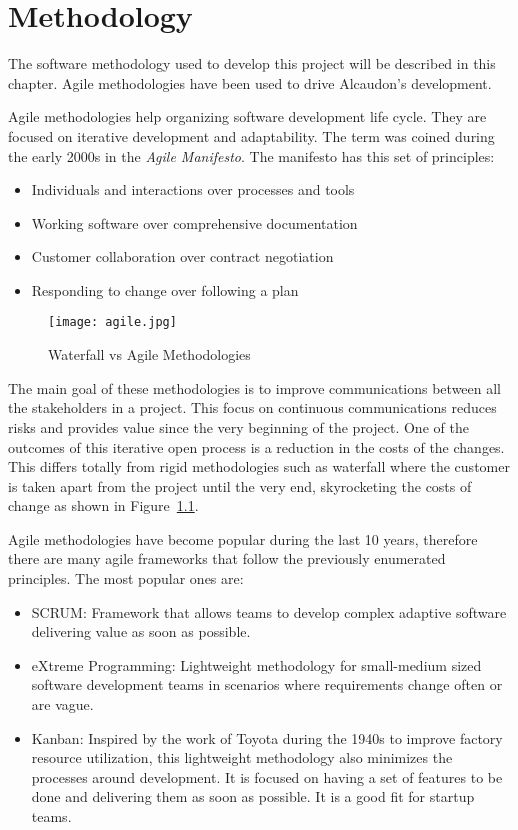 \chapter{Methodology}
The software methodology used to develop this project will be described in this
chapter. Agile methodologies have been used to drive Alcaudon's development.

Agile methodologies help organizing software development life cycle. They are
focused on iterative development and adaptability. The term was coined during
the early 2000s in the \textit{Agile Manifesto}\cite{manifesto}. The manifesto
has this set of principles:

\begin{itemize}
\item Individuals and interactions over processes and tools
\item Working software over comprehensive documentation
\item Customer collaboration over contract negotiation
\item Responding to change over following a plan
\end{itemize}


\begin{figure}
  \centering
  \texttt{[image: agile.jpg]}
  \caption{Waterfall vs Agile Methodologies\cite{waterfall}}
  \label{fig:waterfall}
\end{figure}

The main goal of these methodologies is to improve communications between all
the stakeholders in a project. This focus on continuous communications reduces
risks and provides value since the very beginning of the project. One of the
outcomes of this iterative open process is a reduction in the costs of the
changes. This differs totally from rigid methodologies such as waterfall where
the customer is taken apart from the project until the very end, skyrocketing
the costs of change as shown in Figure~\ref{fig:waterfall}.

Agile methodologies have become popular during the last 10 years, therefore there
are many agile frameworks that follow the previously enumerated principles. The
most popular ones are:
\begin{itemize}
\item SCRUM\cite{scrum}: Framework that allows teams to develop complex
  adaptive software delivering value as soon as possible.
\item eXtreme Programming\cite{xp}: Lightweight methodology for small-medium
  sized software development teams in scenarios where requirements change often
  or are vague.
\item Kanban\cite{kanban}: Inspired by the work of Toyota during the 1940s to improve
  factory resource utilization, this lightweight methodology also minimizes the processes
  around development. It is focused on having a set of features to be done and delivering
  them as soon as possible. It is a good fit for startup teams.
\end{itemize}

